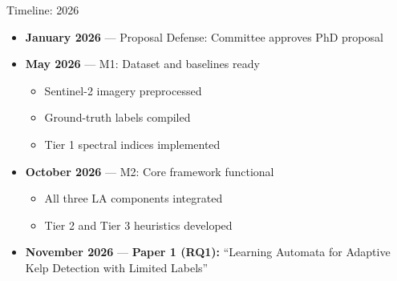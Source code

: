 \documentclass[10pt,xcolor={table,dvipsnames},t]{beamer}
\begin{document}
\begin{frame}{Timeline: 2026}

\begin{itemize}
  \item \textbf{January 2026} --- Proposal Defense: Committee approves PhD proposal

  \vspace{0.3em}
  \item \textbf{May 2026} --- M1: Dataset and baselines ready
  \begin{itemize}
    \item Sentinel-2 imagery preprocessed
    \item Ground-truth labels compiled
    \item Tier 1 spectral indices implemented
  \end{itemize}

  \vspace{0.3em}
  \item \textbf{October 2026} --- M2: Core framework functional
  \begin{itemize}
    \item All three LA components integrated
    \item Tier 2 and Tier 3 heuristics developed
  \end{itemize}

  \vspace{0.3em}
  \item \textbf{November 2026} --- \textbf{Paper 1 (RQ1):} ``Learning Automata for Adaptive Kelp Detection with Limited Labels''
\end{itemize}

\end{frame}
\end{document}
